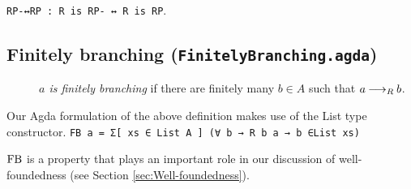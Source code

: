 \verb|RP-↔RP : R is RP- ↔ R is RP|.

\subsection{Finitely branching (\texttt{FinitelyBranching.agda})}

\begin{definition} \hfill
    \begin{description}
        \item[] \emph{$a$ is finitely branching} if there are finitely many $b \in A$ such that $a \mathbin{\longrightarrow_R} b$.
    \end{description}
\end{definition}

Our Agda formulation of the above definition makes use of the List type constructor.
\verb|FB a = Σ[ xs ∈ List A ] (∀ b → R b a → b ∈List xs)|

$\mathrm{FB}$ is a property that plays an important role in our discussion of well-foundedness (see Section \ref{sec:Well-foundedness}).
